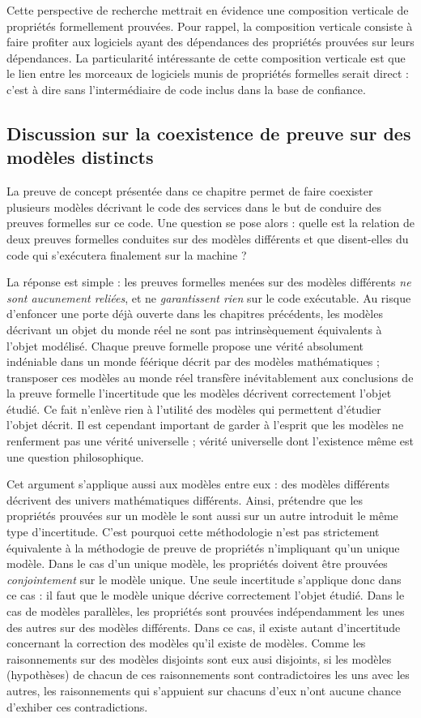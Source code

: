 		Cette perspective de recherche mettrait en évidence une composition verticale de propriétés formellement prouvées. Pour rappel, la composition verticale consiste à faire profiter aux logiciels ayant des dépendances des propriétés prouvées sur leurs dépendances. La particularité intéressante de cette composition verticale est que le lien entre les morceaux de logiciels munis de propriétés formelles serait direct : c'est à dire sans l'intermédiaire de code inclus dans la base de confiance. 

		\subsection{Discussion sur la coexistence de preuve sur des modèles distincts}

		La preuve de concept présentée dans ce chapitre permet de faire coexister plusieurs modèles décrivant le code des services dans le but de conduire des preuves formelles sur ce code. Une question se pose alors : quelle est la relation de deux preuves formelles conduites sur des modèles différents et que disent-elles du code qui s'exécutera finalement sur la machine ?

		La réponse est simple : les preuves formelles menées sur des modèles différents \emph{ne sont aucunement reliées}, et ne \emph{garantissent rien} sur le code exécutable. Au risque d'enfoncer une porte déjà ouverte dans les chapitres précédents, les modèles décrivant un objet du monde réel ne sont pas intrinsèquement équivalents à l'objet modélisé. Chaque preuve formelle propose une vérité absolument indéniable dans un monde féérique décrit par des modèles mathématiques ; transposer ces modèles au monde réel transfère inévitablement aux conclusions de la preuve formelle l'incertitude que les modèles décrivent correctement l'objet étudié. Ce fait n'enlève rien à l'utilité des modèles qui permettent d'étudier l'objet décrit. Il est cependant important de garder à l'esprit que les modèles ne renferment pas une vérité universelle ; vérité universelle dont l'existence même est une question philosophique.

		Cet argument s'applique aussi aux modèles entre eux : des modèles différents décrivent des univers mathématiques différents. Ainsi, prétendre que les propriétés prouvées sur un modèle le sont aussi sur un autre introduit le même type d'incertitude. C'est pourquoi cette méthodologie n'est pas strictement équivalente à la méthodogie de preuve de propriétés n'impliquant qu'un unique modèle. Dans le cas d'un unique modèle, les propriétés doivent être prouvées \emph{conjointement} sur le modèle unique. Une seule incertitude s'applique donc dans ce cas : il faut que le modèle unique décrive correctement l'objet étudié. Dans le cas de modèles parallèles, les propriétés sont prouvées indépendamment les unes des autres sur des modèles différents. Dans ce cas, il existe autant d'incertitude concernant la correction des modèles qu'il existe de modèles. Comme les raisonnements sur des modèles disjoints sont eux ausi disjoints, si les modèles (hypothèses) de chacun de ces raisonnements sont contradictoires les uns avec les autres, les raisonnements qui s'appuient sur chacuns d'eux n'ont aucune chance d'exhiber ces contradictions.

